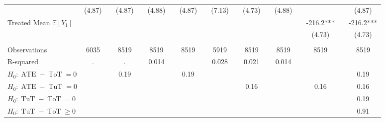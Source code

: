 \begin{tabular}{lccccccccccccccccc}
      & (4.87) &       & (4.87) &       & (4.88) &       & (4.87) &       & (7.13) &       & (4.73) &       & (4.88) &       &       &       & (4.87) \\
Treated Mean $\mathbb{E}[Y_1]$ &       &       &       &       &       &       &       &       &       &       &       &       &       &       & -216.2*** &       & -216.2*** \\
      &       &       &       &       &       &       &       &       &       &       &       &       &       &       & (4.73) &       & (4.73) \\
      &       &       &       &       &       &       &       &       &       &       &       &       &       &       &       &       &  \\
\midrule
Observations & 6035  &       & 8519  &       & 8519  &       & 8519  &       & 5919  &       & 8519  &       & 8519  &       & 8519  &       & 8519 \\
R-squared & .     &       & .     &       & 0.014 &       &       &       & 0.028 &       & 0.021 &       & 0.014 &       &       &       &  \\
\midrule
$H_0 : \operatorname{ATE}-\operatorname{ToT} = 0$ &       &       & 0.19  &       &       &       & 0.19  &       &       &       &       &       &       &       &       &       & 0.19 \\
$H_0 : \operatorname{ATE}-\operatorname{TuT} = 0$ &       &       &       &       &       &       &       &       &       &       & 0.16  &       &       &       & 0.16  &       & 0.16 \\
$H_0 : \operatorname{TuT}-\operatorname{ToT} = 0$ &       &       &       &       &       &       &       &       &       &       &       &       &       &       &       &       & 0.19 \\
$H_0 : \operatorname{TuT}-\operatorname{ToT} \geq 0$ &       &       &       &       &       &       &       &       &       &       &       &       &       &       &       &       & 0.91 \\
\bottomrule
\bottomrule
\end{tabular}%
